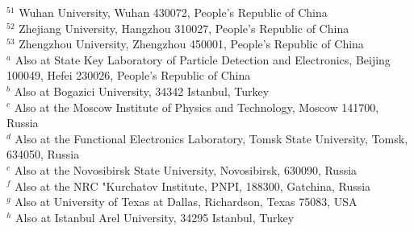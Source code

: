 {\begin{small}
\begin{center}
{$^{51}$ Wuhan University, Wuhan 430072, People's Republic of China\\
$^{52}$ Zhejiang University, Hangzhou 310027, People's Republic of China\\
$^{53}$ Zhengzhou University, Zhengzhou 450001, People's Republic of China\\
\vspace{0.2cm}
$^{a}$ Also at State Key Laboratory of Particle Detection and Electronics, Beijing 100049, Hefei 230026, People's Republic of China\\
$^{b}$ Also at Bogazici University, 34342 Istanbul, Turkey\\
$^{c}$ Also at the Moscow Institute of Physics and Technology, Moscow 141700, Russia\\
$^{d}$ Also at the Functional Electronics Laboratory, Tomsk State University, Tomsk, 634050, Russia\\
$^{e}$ Also at the Novosibirsk State University, Novosibirsk, 630090, Russia\\
$^{f}$ Also at the NRC "Kurchatov Institute, PNPI, 188300, Gatchina, Russia\\
$^{g}$ Also at University of Texas at Dallas, Richardson, Texas 75083, USA\\
$^{h}$ Also at Istanbul Arel University, 34295 Istanbul, Turkey\\
}\end{center}
\vspace{0.4cm}
\end{small}
}
